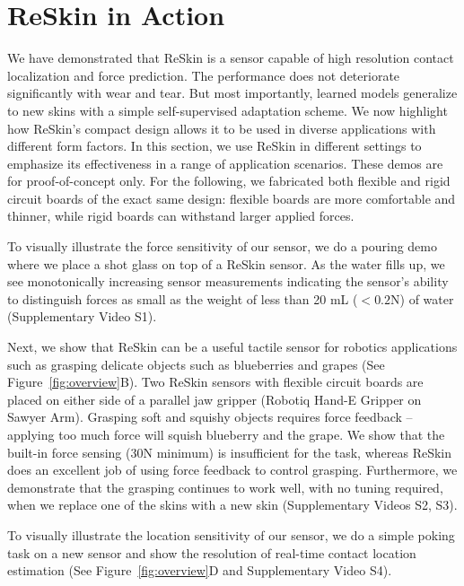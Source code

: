 \documentclass{article}
\begin{document}
\section{ReSkin in Action}
\vspace{-0.1in}
We have demonstrated that ReSkin is a sensor capable of high resolution contact localization and force prediction. The performance does not deteriorate significantly with wear and tear. But most importantly, learned models generalize to new skins with a simple self-supervised adaptation scheme. We now highlight how ReSkin's compact design allows it to be used in diverse applications with different form factors. In this section, we use ReSkin in different settings to emphasize its effectiveness in a range of application scenarios. These demos are for proof-of-concept only. For the following, we fabricated both flexible and rigid circuit boards of the exact same design: flexible boards are more comfortable and thinner, while rigid boards can withstand larger applied forces. 

To visually illustrate the force sensitivity of our sensor, we do a pouring demo where we place a shot glass on top of a ReSkin sensor. As the water fills up, we see monotonically increasing sensor measurements indicating the sensor's ability to distinguish forces as small as the weight of less than 20 mL ($< 0.2$N) of water (Supplementary Video S1).

 Next, we show that ReSkin can be a useful tactile sensor for robotics applications such as grasping delicate objects such as blueberries and grapes (See Figure~\ref{fig:overview}B). Two ReSkin sensors with flexible circuit boards are placed on either side of a parallel jaw gripper (Robotiq Hand-E Gripper on Sawyer Arm). Grasping soft and squishy objects requires force feedback -- applying too much force will squish blueberry and the grape. We show that the built-in force sensing (30N minimum) is insufficient for the task, whereas ReSkin does an excellent job of using force feedback to control grasping. Furthermore, we demonstrate that the grasping continues to work well, with no tuning required, when we replace one of the skins with a new skin (Supplementary Videos S2, S3).

To visually illustrate the location sensitivity of our sensor, we do a simple poking task on a new sensor and show the resolution of real-time contact location estimation (See Figure~\ref{fig:overview}D and Supplementary Video S4).
\end{document}
